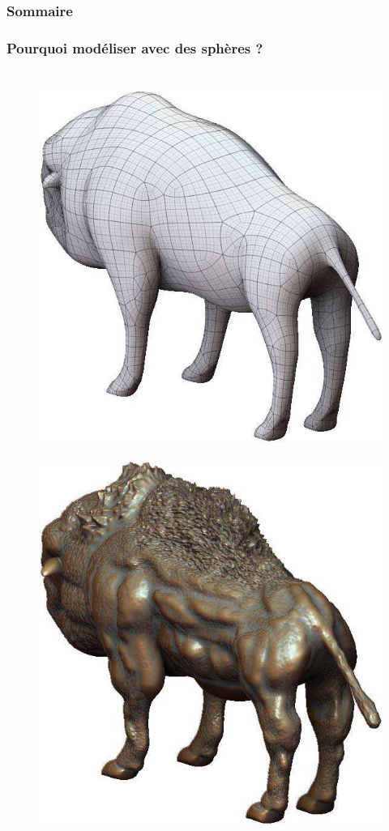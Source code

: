 \documentclass[9pt]{beamer}
\begin{document}
\begin{frame}
	\frametitle{Sommaire}
	\tableofcontents[currentsection]
\end{frame}

\begin{frame}
	\frametitle{Pourquoi modéliser avec des sphères ?}
	\begin{figure}[H]
		\centering
		\leavevmode
  		\hbox{
  			\includegraphics[scale=0.2]{images/basemesh.jpg}
  			\hspace*{0.5cm} 
     		\includegraphics[scale=0.2]{images/detailedmesh.jpg}
     		\hspace*{0.5cm}  
  		}
	\end{figure}
\end{frame}
\end{document}
